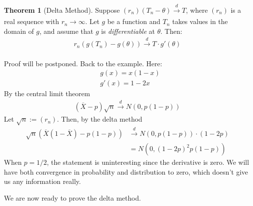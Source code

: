 \documentclass[11pt]{scrartcl}
\theoremstyle{definition}
\newtheorem{theorem}{Theorem}
\theoremstyle{remark}
\begin{document}
{\begin{theorem}[Delta Method]
	Suppose $(r_n)(T_n - \theta) \xrightarrow[]{d} T$, where $(r_n)$ is a real sequence with $r_n \rightarrow \infty$. Let $g$ be a function and $T_n$ takes values in the domain of $g$, and assume that $g$ is \emph{differentiable} at $\theta$. Then: 
	\begin{align}
		r_n ( g(T_n) - g(\theta)) \xrightarrow[]{d} T \cdot g'(\theta) 
	\end{align}
\end{theorem}
Proof will be postponed. Back to the example. Here: 
\begin{align*}
	& g(x) = x(1-x) \\
	& g'(x) = 1-2x 	
\end{align*}
By the central limit theorem
\begin{align*}
	(\overline{X} - p) \sqrt{n} \xrightarrow[]{d} N (0, p(1-p)) 	
\end{align*}
Let $\sqrt{n} := (r_n)$. Then, by the delta method
\begin{align*}
	\sqrt{n} (\overline{X} (1 - \overline{X} ) - p(1-p)) & \xrightarrow[]{d} N(0, p(1-p)) \cdot (1-2p) \\ 
		& = N(0, (1-2p)^2p(1-p)) 
\end{align*}
When $p=1/2$, the statement is uninteresting since the derivative is zero. We will have both convergence in probability and distribution to zero, which doesn't give us any information really. 

We are now ready to prove the delta method. 

}
\end{document}
